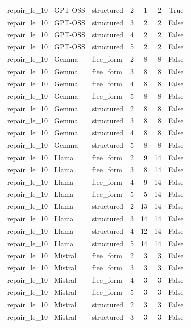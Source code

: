 \begin{longtable}{lllrrrr}
repair\_le\_10 & GPT-OSS & structured & 2 & 1 & 2 & True \\
repair\_le\_10 & GPT-OSS & structured & 3 & 2 & 2 & False \\
repair\_le\_10 & GPT-OSS & structured & 4 & 2 & 2 & False \\
repair\_le\_10 & GPT-OSS & structured & 5 & 2 & 2 & False \\
repair\_le\_10 & Gemma & free\_form & 2 & 8 & 8 & False \\
repair\_le\_10 & Gemma & free\_form & 3 & 8 & 8 & False \\
repair\_le\_10 & Gemma & free\_form & 4 & 8 & 8 & False \\
repair\_le\_10 & Gemma & free\_form & 5 & 8 & 8 & False \\
repair\_le\_10 & Gemma & structured & 2 & 8 & 8 & False \\
repair\_le\_10 & Gemma & structured & 3 & 8 & 8 & False \\
repair\_le\_10 & Gemma & structured & 4 & 8 & 8 & False \\
repair\_le\_10 & Gemma & structured & 5 & 8 & 8 & False \\
repair\_le\_10 & Llama & free\_form & 2 & 9 & 14 & False \\
repair\_le\_10 & Llama & free\_form & 3 & 8 & 14 & False \\
repair\_le\_10 & Llama & free\_form & 4 & 9 & 14 & False \\
repair\_le\_10 & Llama & free\_form & 5 & 5 & 14 & False \\
repair\_le\_10 & Llama & structured & 2 & 13 & 14 & False \\
repair\_le\_10 & Llama & structured & 3 & 14 & 14 & False \\
repair\_le\_10 & Llama & structured & 4 & 12 & 14 & False \\
repair\_le\_10 & Llama & structured & 5 & 14 & 14 & False \\
repair\_le\_10 & Mistral & free\_form & 2 & 3 & 3 & False \\
repair\_le\_10 & Mistral & free\_form & 3 & 3 & 3 & False \\
repair\_le\_10 & Mistral & free\_form & 4 & 3 & 3 & False \\
repair\_le\_10 & Mistral & free\_form & 5 & 3 & 3 & False \\
repair\_le\_10 & Mistral & structured & 2 & 3 & 3 & False \\
repair\_le\_10 & Mistral & structured & 3 & 3 & 3 & False \\

\end{longtable}
